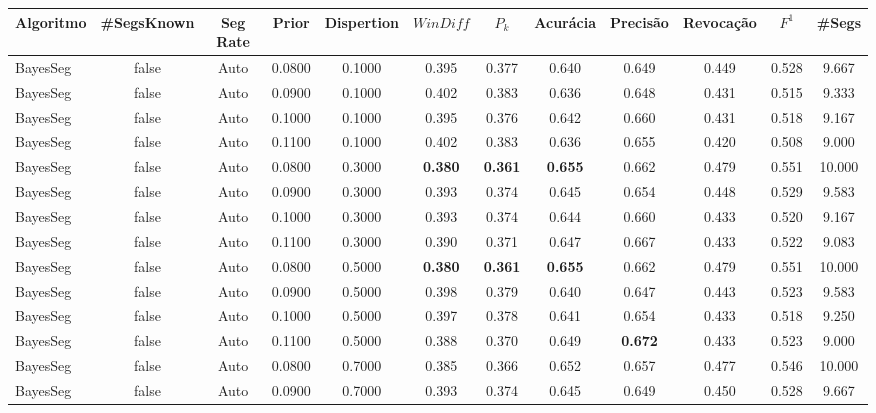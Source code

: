 \documentclass{article}
\begin{document}
\newpage
\begin{longtable}[c]{|l|c|c|c|c|c|c|c|c|c|c|c|} 
\hline 
Algoritmo & \#SegsKnown & Seg Rate & Prior & Dispertion & $WinDiff$ & $P_k$ & Acurácia & Precisão & Revocação & $F^1$ & \#Segs\\ \hline 
BayesSeg & false & Auto & 0.0800 & 0.1000 & 0.395 & 0.377 & 0.640 & 0.649 & 0.449 & 0.528 & 9.667  \\ \hline 
 BayesSeg & false & Auto & 0.0900 & 0.1000 & 0.402 & 0.383 & 0.636 & 0.648 & 0.431 & 0.515 & 9.333  \\ \hline 
 BayesSeg & false & Auto & 0.1000 & 0.1000 & 0.395 & 0.376 & 0.642 & 0.660 & 0.431 & 0.518 & 9.167  \\ \hline 
 BayesSeg & false & Auto & 0.1100 & 0.1000 & 0.402 & 0.383 & 0.636 & 0.655 & 0.420 & 0.508 & 9.000  \\ \hline 
 BayesSeg & false & Auto & 0.0800 & 0.3000 & \cellcolor{gray!20} \textbf{0.380} & \cellcolor{gray!20} \textbf{0.361} & \cellcolor{gray!20} \textbf{0.655} & 0.662 & 0.479 & 0.551 & 10.000  \\ \hline 
 BayesSeg & false & Auto & 0.0900 & 0.3000 & 0.393 & 0.374 & 0.645 & 0.654 & 0.448 & 0.529 & 9.583  \\ \hline 
 BayesSeg & false & Auto & 0.1000 & 0.3000 & 0.393 & 0.374 & 0.644 & 0.660 & 0.433 & 0.520 & 9.167  \\ \hline 
 BayesSeg & false & Auto & 0.1100 & 0.3000 & 0.390 & 0.371 & 0.647 & 0.667 & 0.433 & 0.522 & 9.083  \\ \hline 
 BayesSeg & false & Auto & 0.0800 & 0.5000 & \cellcolor{gray!20} \textbf{0.380} & \cellcolor{gray!20} \textbf{0.361} & \cellcolor{gray!20} \textbf{0.655} & 0.662 & 0.479 & 0.551 & 10.000  \\ \hline 
 BayesSeg & false & Auto & 0.0900 & 0.5000 & 0.398 & 0.379 & 0.640 & 0.647 & 0.443 & 0.523 & 9.583  \\ \hline 
 BayesSeg & false & Auto & 0.1000 & 0.5000 & 0.397 & 0.378 & 0.641 & 0.654 & 0.433 & 0.518 & 9.250  \\ \hline 
 BayesSeg & false & Auto & 0.1100 & 0.5000 & 0.388 & 0.370 & 0.649 & \cellcolor{gray!20} \textbf{0.672} & 0.433 & 0.523 & 9.000  \\ \hline 
 BayesSeg & false & Auto & 0.0800 & 0.7000 & 0.385 & 0.366 & 0.652 & 0.657 & 0.477 & 0.546 & 10.000  \\ \hline 
 BayesSeg & false & Auto & 0.0900 & 0.7000 & 0.393 & 0.374 & 0.645 & 0.649 & 0.450 & 0.528 & 9.667  \\ \hline 

\end{longtable}
\end{document}
